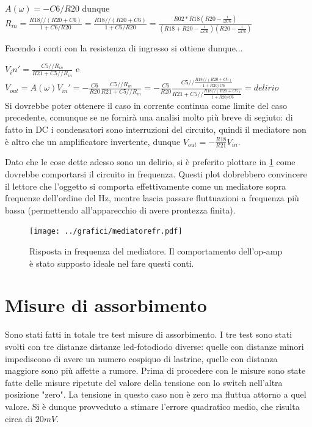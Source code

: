 \documentclass[a4paper,10pt]{article}
\begin{document}
$A(\omega)=-C6/R20$ dunque $R_{in}=\frac{R18//(R20+C6)}{1+C6/R20}=\frac{R18//(R20+C6)}{1+C6/R20}=\frac{R02*R18(R20-\frac{i}{\omega C6})}{(R18+R20-\frac{i}{\omega C6})(R20-\frac{i}{\omega C6})}$

Facendo i conti con la resistenza di ingresso si ottiene dunque...

$V_in'=\frac{C5//R_{in}}{R21+C5//R_{in}}$ e $V_{out}=A(\omega)V_{in}'=-\frac{C6}{R20}\frac{C5//R_{in}}{R21+C5//R_{in}}=-\frac{C6}{R20}\frac{C5//\frac{R18//(R20+C6)}{1+R20/C6}}{R21+C5//\frac{R18//(R20+C6)}{1+R20/C6}}=delirio$\\

Si dovrebbe poter ottenere il caso in corrente continua come limite del caso precedente, comunque se ne fornirà una analisi molto più breve di segiuto: di fatto in DC i condensatori sono interruzioni del circuito, quindi il mediatore non è altro che un amplificatore invertente, dunque $V_{out}=-\frac{R18}{R21}V_{in}$.

Dato che le cose dette adesso sono un delirio, si è preferito plottare in \cref{fig:MEDFR} come dovrebbe comportarsi il circuito in frequenza. Questi plot dobrebbero convincere il lettore che l'oggetto si comporta effettivamente come un mediatore sopra frequenze dell'ordine del Hz, mentre lascia passare fluttuazioni a frequenza più bassa (permettendo all'apparecchio di avere prontezza finita).

\begin{figure}[H]
	\centering
	\texttt{[image: ../grafici/mediatorefr.pdf]}
	\caption{Risposta in frequenza del mediatore. Il comportamento dell'op-amp è stato supposto ideale nel fare questi conti.}
	\label{fig:MEDFR}
\end{figure}




\section{Misure di assorbimento}


Sono stati fatti in totale tre test misure di assorbimento. I tre test sono stati svolti con tre distanze distanze led-fotodiodo diverse: quelle con distanze minori impediscono di avere un numero cospiquo di lastrine, quelle con distanza maggiore sono più affette a rumore. 
Prima di procedere con le misure sono state fatte delle misure ripetute del valore della tensione con lo switch nell'altra posizione "zero". La tensione in questo caso non è zero ma fluttua attorno a quel valore. Si è dunque provveduto a stimare l'errore quadratico medio, che risulta circa di $20 mV$.
\end{document}
